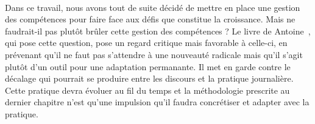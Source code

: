 \paragraph{} Dans ce travail, nous avons tout de suite décidé de mettre en place une gestion des compétences pour faire face aux défis que constitue la croissance. Mais ne faudrait-il pas plutôt brûler cette gestion des compétences ? Le livre de Antoine~\citep[pp.253]{competencesbruler2006}, qui pose cette question, pose un regard critique mais favorable à celle-ci, en prévenant qu'il ne faut pas s'attendre à une nouveauté radicale mais qu'il s'agit plutôt d'un outil pour une adaptation permanante. Il met en garde contre le décalage qui pourrait se produire entre les discours et la pratique journalière. Cette pratique devra évoluer au fil du temps et la méthodologie prescrite au dernier chapitre n'est qu'une impulsion qu'il faudra concrétiser et adapter avec la pratique.   

